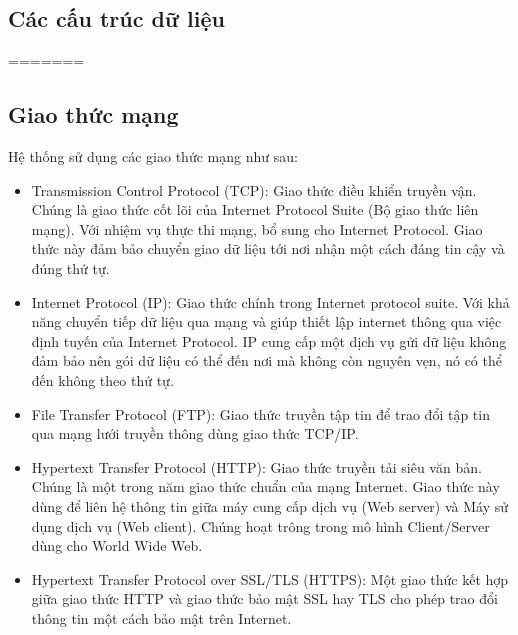 \documentclass[a4paper, 12pt]{article}
\begin{document}
\subsection{Các cấu trúc dữ liệu}
=======
	\subsection{Giao thức mạng}
	Hệ thống sử dụng các giao thức mạng như sau:
	\begin{itemize}
		\item Transmission Control Protocol (TCP): Giao thức điều khiển truyền vận. Chúng là giao thức cốt lõi của Internet Protocol Suite (Bộ giao thức liên mạng). Với nhiệm vụ thực thi mạng, bổ sung cho Internet Protocol. Giao thức này đảm bảo chuyển giao dữ liệu tới nơi nhận một cách đáng tin cậy và đúng thứ tự.
		\item Internet Protocol (IP): Giao thức chính trong Internet protocol suite. Với khả năng chuyển tiếp dữ liệu qua mạng và giúp thiết lập internet thông qua việc định tuyến  của Internet Protocol. IP cung cấp một dịch vụ gửi dữ liệu không đảm bảo  nên gói dữ liệu có thể đến nơi mà không còn nguyên vẹn, nó có thể đến không theo thứ tự.
		\item File Transfer Protocol (FTP): Giao thức truyền tập tin để trao đổi tập tin qua mạng lưới truyền thông dùng giao thức TCP/IP.
		\item Hypertext Transfer Protocol (HTTP): Giao thức truyền tải siêu văn bản. Chúng là một trong năm giao thức chuẩn của mạng Internet. Giao thức này dùng để liên hệ thông tin giữa máy cung cấp dịch vụ (Web server) và Máy sử dụng dịch vụ (Web client). Chúng hoạt trông trong mô hình Client/Server dùng cho World Wide Web.
		\item Hypertext Transfer Protocol over SSL/TLS (HTTPS): Một giao thức kết hợp giữa giao thức HTTP và giao thức bảo mật SSL hay TLS cho phép trao đổi thông tin một cách bảo mật trên Internet.
	\end{itemize}
	\clearpage
	
\end{document}
